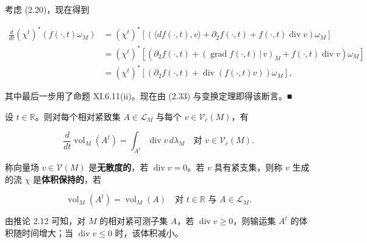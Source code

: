 \begin{theorem}
考虑 (2.20)，现在得到

\begin{equation*}
\begin{aligned}
\frac{d}{dt}(\chi^t)^*(f(\cdot,t)\omega_M) &= (\chi^t)^*\left[(\langle df(\cdot,t), v\rangle + \partial_2 f(\cdot,t) + f(\cdot,t)\operatorname{div} v)\omega_M\right] \\ &= (\chi^t)^*\left[(\partial_2 f(\cdot,t) + (\operatorname{grad} f(\cdot,t)\,|\,v)_M + f(\cdot,t)\operatorname{div} v)\omega_M\right] \\ &= (\chi^t)^*\left[(\partial_2 f(\cdot,t) + \operatorname{div}(f(\cdot,t)v))\omega_M\right] ,
\end{aligned}
\end{equation*}

其中最后一步用了命题 XI.6.11(ii)。现在由 (2.33) 与变换定理即得该断言。\nobreak\hspace{0.35em}■

\end{theorem}

\begin{corollary}

设 $ t \in \mathbb{R} $。则对每个相对紧致集 $ A \in \mathcal{L}_M $ 与每个 $ v \in \mathcal{V}_c(M) $，有

\[
\frac{d}{dt}\operatorname{vol}_M(A^t) = \int_{A^t} \operatorname{div} v \, d\lambda_M \quad \text{对 } v \in \mathcal{V}_c(M) .
\]

称向量场 $ v \in \mathcal{V}(M) $ 是\textbf{无散度的}，若 $ \operatorname{div} v = 0 $。若 $ v $ 具有紧支集，则称 $ v $ 生成的流 $ \chi $ 是\textbf{体积保持的}，若

\[
\operatorname{vol}_M(A^t) = \operatorname{vol}_M(A) \quad \text{对 } t \in \mathbb{R} \text{ 与 } A \in \mathcal{L}_M .
\]

由推论 2.12 可知，对 $ M $ 的相对紧可测子集 $ A $，若 $ \operatorname{div} v \ge 0 $，则输运集 $ A^t $ 的体积随时间增大；当 $ \operatorname{div} v \le 0 $ 时，该体积减小。

\end{corollary}

